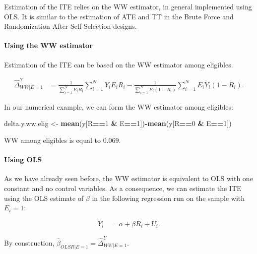 \documentclass[]{book}
\newenvironment{Shaded}{\begin{snugshade}}{\end{snugshade}}
\newcommand{\KeywordTok}[1]{\textcolor[rgb]{0.13,0.29,0.53}{\textbf{#1}}}
\newcommand{\DecValTok}[1]{\textcolor[rgb]{0.00,0.00,0.81}{#1}}
\newcommand{\StringTok}[1]{\textcolor[rgb]{0.31,0.60,0.02}{#1}}
\newcommand{\OperatorTok}[1]{\textcolor[rgb]{0.81,0.36,0.00}{\textbf{#1}}}
\newcommand{\NormalTok}[1]{#1}
\let\oldparagraph\paragraph
\renewcommand{\paragraph}[1]{\oldparagraph{#1}\mbox{}}
\theoremstyle{definition}
\theoremstyle{definition}
\theoremstyle{definition}
\theoremstyle{remark}
\let\BeginKnitrBlock\begin \let\EndKnitrBlock\end
\begin{document}
Estimation of the ITE relies on the WW estimator, in general implemented
using OLS. It is similar to the estimation of ATE and TT in the Brute
Force and Randomization After Self-Selection designs.

\paragraph{Using the WW estimator}\label{using-the-ww-estimator-2}

Estimation of the ITE can be based on the WW estimator among eligibles.

\begin{align*}
  \hat{\Delta}^Y_{WW|E=1} & = \frac{1}{\sum_{i=1}^N E_iR_i}\sum_{i=1}^N Y_iE_iR_i-\frac{1}{\sum_{i=1}^N E_i(1-R_i)}\sum_{i=1}^N E_iY_i(1-R_i).
\end{align*}

\BeginKnitrBlock{example}
\protect\hypertarget{exm:unnamed-chunk-94}{}{\label{exm:unnamed-chunk-94}
}In our numerical example, we can form the WW estimator among eligibles:
\EndKnitrBlock{example}

\begin{Shaded}
\begin{Highlighting}[]
\NormalTok{delta.y.ww.elig <-}\StringTok{ }\KeywordTok{mean}\NormalTok{(y[R}\OperatorTok{==}\DecValTok{1} \OperatorTok{&}\StringTok{ }\NormalTok{E}\OperatorTok{==}\DecValTok{1}\NormalTok{])}\OperatorTok{-}\KeywordTok{mean}\NormalTok{(y[R}\OperatorTok{==}\DecValTok{0} \OperatorTok{&}\StringTok{ }\NormalTok{E}\OperatorTok{==}\DecValTok{1}\NormalTok{])}
\end{Highlighting}
\end{Shaded}

WW among eligibles is equal to 0.069.

\paragraph{Using OLS}\label{using-ols-2}

As we have already seen before, the WW estimator is equivalent to OLS
with one constant and no control variables. As a consequence, we can
estimate the ITE using the OLS estimate of \(\beta\) in the following
regression run on the sample with \(E_i=1\):

\begin{align*}
  Y_i & = \alpha + \beta R_i + U_i.
\end{align*}

By construction, \(\hat{\beta}_{OLSR|E=1}=\hat{\Delta}^Y_{WW|E=1}\).
\end{document}
